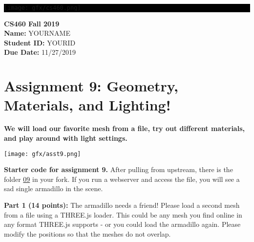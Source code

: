 \documentclass[10pt,oneside,onecolumn,letterpaper]{article}
\begin{document}
\noindent\colorbox{black}{
\begin{minipage}[c]{.99\linewidth}
  \vspace{.4cm}
  \Large{}
  \begin{flushright}
    \vspace{-1.2cm}
    \texttt{[image: gfx/cs460.png]}
  \end{flushright}
\end{minipage}
}


\vspace{.5cm} %

\noindent\textbf{CS460 Fall 2019} \\
\textbf{Name:} YOURNAME \\
\textbf{Student ID:} YOURID \\
\textbf{Due Date:} 11/27/2019

\section*{Assignment 9: Geometry, Materials, and Lighting!}

\textbf{We will load our favorite mesh from a file, try out different materials, and play around with light settings.}

\vspace{.5cm} %

\begin{center}
\texttt{[image: gfx/asst9.png]}
\end{center}

\vspace{.5cm}

\noindent\textbf{Starter code for assignment 9.} After pulling from upstream, there is the folder \url{09} in your fork. If you run a webserver and access the file, you will see a sad single armadillo in the scene.

\vspace{.5cm}


\noindent\textbf{Part 1 (14 points):} The armadillo needs a friend! Please load a second mesh from a file using a THREE.js loader. This could be any mesh you find online in any format THREE.js supports - or you could load the armadillo again. Please modify the positions so that the meshes do not overlap.
\end{document}
